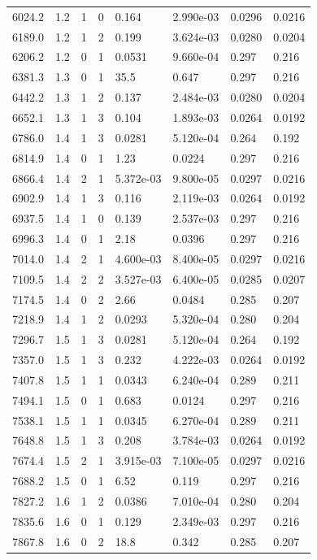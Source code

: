 \documentclass[preview]{standalone}
\begin{document}
{{{\begin{tabular}{L{1.2cm}C{1.2cm} C{0.3cm}C{0.5cm} C{1.4cm}C{1.4cm} C{1.4cm}C{1.4cm}}
  6024.2  &   1.2  & 1     &  0 &  0.164  & 2.990e-03  & 0.0296 &  0.0216   \\ 
  6189.0  &   1.2  & 1     &  2 &  0.199  & 3.624e-03  & 0.0280 &  0.0204   \\ 
  6206.2  &   1.2  & 0     &  1 &  0.0531  & 9.660e-04  & 0.297 &  0.216   \\ 
  6381.3  &   1.3  & 0     &  1 &  35.5  & 0.647  & 0.297 &  0.216   \\ 
  6442.2  &   1.3  & 1     &  2 &  0.137  & 2.484e-03  & 0.0280 &  0.0204   \\ 
  6652.1  &   1.3  & 1     &  3 &  0.104  & 1.893e-03  & 0.0264 &  0.0192   \\ 
  6786.0  &   1.4  & 1     &  3 &  0.0281  & 5.120e-04  & 0.264 &  0.192   \\ 
  6814.9  &   1.4  & 0     &  1 &  1.23  & 0.0224  & 0.297 &  0.216   \\ 
  6866.4  &   1.4  & 2     &  1 &  5.372e-03  & 9.800e-05  & 0.0297 &  0.0216   \\ 
  6902.9  &   1.4  & 1     &  3 &  0.116  & 2.119e-03  & 0.0264 &  0.0192   \\ 
  6937.5  &   1.4  & 1     &  0 &  0.139  & 2.537e-03  & 0.297 &  0.216   \\ 
  6996.3  &   1.4  & 0     &  1 &  2.18  & 0.0396  & 0.297 &  0.216   \\ 
  7014.0  &   1.4  & 2     &  1 &  4.600e-03  & 8.400e-05  & 0.0297 &  0.0216   \\ 
  7109.5  &   1.4  & 2     &  2 &  3.527e-03  & 6.400e-05  & 0.0285 &  0.0207   \\ 
  7174.5  &   1.4  & 0     &  2 &  2.66  & 0.0484  & 0.285 &  0.207   \\ 
  7218.9  &   1.4  & 1     &  2 &  0.0293  & 5.320e-04  & 0.280 &  0.204   \\ 
  7296.7  &   1.5  & 1     &  3 &  0.0281  & 5.120e-04  & 0.264 &  0.192   \\ 
  7357.0  &   1.5  & 1     &  3 &  0.232  & 4.222e-03  & 0.0264 &  0.0192   \\ 
  7407.8  &   1.5  & 1     &  1 &  0.0343  & 6.240e-04  & 0.289 &  0.211   \\ 
  7494.1  &   1.5  & 0     &  1 &  0.683  & 0.0124  & 0.297 &  0.216   \\ 
  7538.1  &   1.5  & 1     &  1 &  0.0345  & 6.270e-04  & 0.289 &  0.211   \\ 
  7648.8  &   1.5  & 1     &  3 &  0.208  & 3.784e-03  & 0.0264 &  0.0192   \\ 
  7674.4  &   1.5  & 2     &  1 &  3.915e-03  & 7.100e-05  & 0.0297 &  0.0216   \\ 
  7688.2  &   1.5  & 0     &  1 &  6.52  & 0.119  & 0.297 &  0.216   \\ 
  7827.2  &   1.6  & 1     &  2 &  0.0386  & 7.010e-04  & 0.280 &  0.204   \\ 
  7835.6  &   1.6  & 0     &  1 &  0.129  & 2.349e-03  & 0.297 &  0.216   \\ 
  7867.8  &   1.6  & 0     &  2 &  18.8  & 0.342  & 0.285 &  0.207   \\ 
\hline 
\end{tabular} 

}}}
\end{document}
